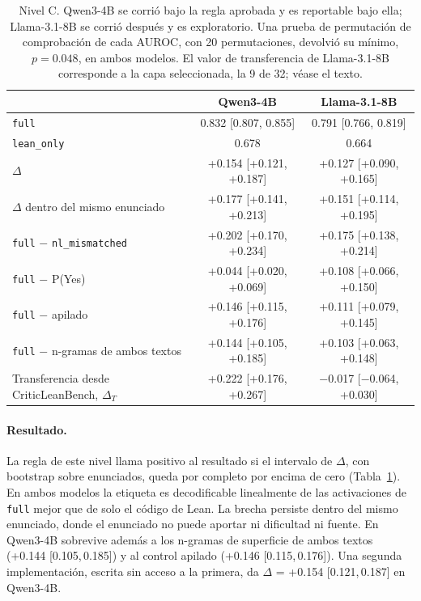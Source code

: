 \documentclass[10pt]{article}
\newcommand{\vr}[1]{\texttt{#1}}
\newcommand{\D}{\Delta}
\newcommand{\ic}[2]{[#1,\,#2]}
\begin{document}
\begin{table}[h]
\centering
\caption{Nivel C. Qwen3-4B se corrió bajo la regla aprobada y es reportable bajo ella; Llama-3.1-8B se corrió
después y es exploratorio. Una prueba de permutación de comprobación de cada AUROC, con 20 permutaciones, devolvió su mínimo, $p = 0.048$, en
ambos modelos. El valor de transferencia de Llama-3.1-8B corresponde a la capa seleccionada, la 9 de 32; véase el texto.}
\label{tab:c}
\vspace{2pt}
\begin{tabular}{@{}lcc@{}}
\toprule
 & Qwen3-4B & Llama-3.1-8B\\
\midrule
\vr{full}                               & 0.832 [0.807, 0.855] & 0.791 [0.766, 0.819]\\
\vr{lean\_only}                         & 0.678 & 0.664\\
$\D$                                    & +0.154 [+0.121, +0.187] & +0.127 [+0.090, +0.165]\\
$\D$ dentro del mismo enunciado         & +0.177 [+0.141, +0.213] & +0.151 [+0.114, +0.195]\\
\vr{full} $-$ \vr{nl\_mismatched}       & +0.202 [+0.170, +0.234] & +0.175 [+0.138, +0.214]\\
\vr{full} $-$ P(Yes)                    & +0.044 [+0.020, +0.069] & +0.108 [+0.066, +0.150]\\
\vr{full} $-$ apilado                 & +0.146 [+0.115, +0.176] & +0.111 [+0.079, +0.145]\\
\vr{full} $-$ n-gramas de ambos textos       & +0.144 [+0.105, +0.185] & +0.103 [+0.063, +0.148]\\
\midrule
Transferencia desde CriticLeanBench, $\D_T$ & +0.222 [+0.176, +0.267] & −0.017 [−0.064, +0.030]\\
\bottomrule
\end{tabular}
\end{table}

\paragraph{Resultado.}
La regla de este nivel llama positivo al resultado si el intervalo de $\D$, con bootstrap sobre enunciados, queda
por completo por encima de cero (Tabla~\ref{tab:c}). En ambos modelos la etiqueta es decodificable linealmente de las activaciones de \vr{full} mejor que de solo el código de Lean.
La brecha persiste dentro del mismo enunciado, donde el enunciado no puede aportar ni dificultad ni fuente. En
Qwen3-4B sobrevive además a los n-gramas de superficie de ambos textos (+0.144 \ic{0.105}{0.185}) y al control
apilado (+0.146 \ic{0.115}{0.176}). Una segunda implementación, escrita sin acceso a la primera, da $\D$ = +0.154 \ic{0.121}{0.187} en Qwen3-4B.
\end{document}
